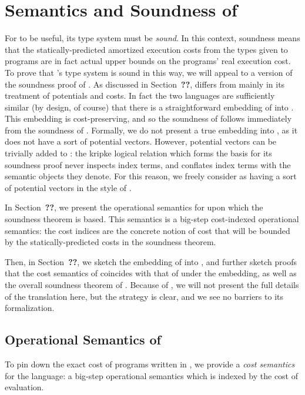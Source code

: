 \section{Semantics and Soundness of \dlambdaamor}
For \dlambdaamor to be useful, its type system must be \textit{sound}. In this context, soundness means that the statically-predicted amortized execution costs from the types given to programs are in fact actual upper bounds on the programs' real execution cost. To prove that \dlambdaamor's type system is sound in this way, we will appeal to a version of the soundness proof of \lambdaamor. As discussed in Section~\textbf{??}, \lambdaamor differs from \dlambdaamor mainly in its treatment of potentials and costs. In fact the two languages are sufficiently similar (by design, of course) that there is a straightforward embedding of \dlambdaamor into \lambdaamor. This embedding is cost-preserving, and so the soundness of \dlambdaamor follows immediately from the soundness of \lambdaamor. Formally, we do not present a true embedding into \lambdaamor, as it does not have a sort of potential vectors. However, potential vectors can be trivially added to \lambdaamor: the kripke logical relation which forms the basis for its soundness proof never inspects index terms, and conflates index terms with the semantic objects they denote. For this reason, we freely consider \lambdaamor as having a sort of potential vectors in the style of \dlambdaamor.

In Section~\textbf{??}, we present the operational semantics for \dlambdaamor upon which the soundness theorem is based. This semantics is a big-step cost-indexed operational semantics: the cost indices are the concrete notion of cost that will be bounded by the statically-predicted costs in the soundness theorem.

Then, in Section~\textbf{??}, we sketch the embedding of \dlambdaamor into \lambdaamor, and further sketch proofs that the cost semantics of \dlambdaamor coincides with that of \lambdaamor under the embedding, as well as the overall soundness theorem of \dlambdaamor. Because of , we will not present the full details of the translation here, but the strategy is clear, and we see no barriers to its formalization.


\subsection{Operational Semantics of \dlambdaamor}
To pin down the exact cost of programs written in \dlambdaamor, we provide a \textit{cost semantics} for the language: a big-step operational semantics which is indexed by the cost of evaluation.

